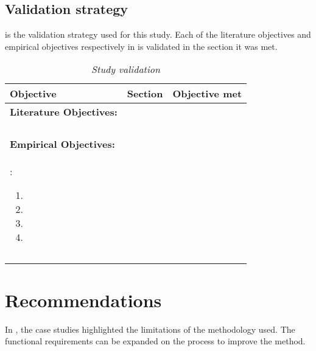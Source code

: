 \subsection{Validation strategy}
 is the validation strategy used for this study. Each of the literature objectives and empirical objectives respectively in  is validated in the section it was met.

\clearpage

\begin{table}[!htb]
	\centering
	\caption[Study validation]
	{\textit{Study validation}}
	\label{tbl:ch4_ValidationStart}
	\begin{tabularx}{\textwidth}{Xp{3cm}p{3cm}}
		\toprule
		\textbf{Objective}  & \textbf{Section} & \textbf{Objective met} \\ \midrule
		\textbf{Literature Objectives:} & & \\ \midrule
		\rowcolor{lightgray}
		\RaggedRight \objAi & \RaggedRight \Cref{sec:ch2_logAttributesRequirements,sec:ch2_webApplicationArchitecture} & \cmark \\
		\RaggedRight \objAii & \RaggedRight \Cref{sec:ch2_loggingPoints,sec:ch2_webApplicationArchitecture} & \cmark \\
		\rowcolor{lightgray}
		\RaggedRight \objAiii & \Cref{sec:ch2_logAnalysisTools} & \cmark \\ 
		\RaggedRight \objAiv & \Cref{sec:ch2_utilisationImprovements} & \cmark \\ \midrule
		\textbf{Empirical Objectives:} & & \\ \midrule
		\rowcolor{lightgray}
		\RaggedRight \objBi: 
			\begin{enumerate}
				\item \objBiSubA
				\item \objBiSubB
				\item \objBiSubD
				\item \objBiSubC
			\end{enumerate} & \Cref{sec:ch3_implementation} & \cmark \\
		\RaggedRight \objBii & \Cref{sec:ch3_Verification} & \cmark \\
		\rowcolor{lightgray}
		\RaggedRight \objBiii & \Cref{sec:ch3_caseStudies} & \cmark \\
		\bottomrule
	\end{tabularx}
\end{table}


\section{Recommendations}
In , the case studies highlighted the limitations of the methodology used. The functional requirements can be expanded on the process to improve the method.

